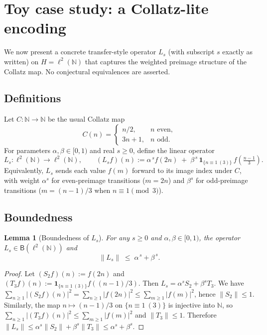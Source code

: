 \documentclass[11pt]{article}
\newtheorem{lemma}[theorem]{Lemma}
\theoremstyle{definition}
\theoremstyle{remark}
\newcommand{\N}{\mathbb{N}}
\newcommand{\1}{\mathbf{1}}
\begin{document}
\section{Toy case study: a Collatz-lite encoding}
We now present a concrete transfer-style operator \(L_s\) (with subscript \(s\) exactly as written) on \(H=\ell^2(\N)\) that captures the weighted preimage structure of the Collatz map. No conjectural equivalences are asserted.

\subsection*{Definitions}
Let \(C:\N\to\N\) be the usual Collatz map
\[
  C(n)=\begin{cases}
    n/2, & n\text{ even},\\
    3n+1, & n\text{ odd}.
  \end{cases}
\]
For parameters \(\alpha,\beta\in[0,1)\) and real \(s\ge 0\), define the linear operator
\[
  L_s: \ell^2(\N)\longrightarrow \ell^2(\N),\qquad (L_s f)(n) := \alpha^{\,s} f(2n)\;+\;\beta^{\,s}\, \mathbf{1}_{\{n\equiv 1\ (3)\}}\, f\!\left(\tfrac{n-1}{3}\right).
\]
Equivalently, \(L_s\) sends each value \(f(m)\) forward to its image index under \(C\), with weight \(\alpha^{s}\) for even-preimage transitions (\(m=2n\)) and \(\beta^{s}\) for odd-preimage transitions (\(m=(n-1)/3\) when \(n\equiv1\pmod 3\)).

\subsection*{Boundedness}
\begin{lemma}[Boundedness of \(L_s\)]\label{lem:Ls-bounded}
For any \(s\ge 0\) and \(\alpha,\beta\in[0,1)\), the operator \(L_s\in \mathsf{B}(\ell^2(\N))\) and
\[
  \|L_s\|\;\le\; \alpha^{\,s} + \beta^{\,s}.
\]
\end{lemma}
\begin{proof}
Let \((S_2 f)(n):=f(2n)\) and \((T_3 f)(n):=\mathbf{1}_{\{n\equiv1\ (3)\}} f((n-1)/3)\). Then \(L_s=\alpha^{s} S_2 + \beta^{s} T_3\). We have
\(\sum_{n\ge1}|(S_2 f)(n)|^2=\sum_{n\ge1}|f(2n)|^2\le\sum_{m\ge1}|f(m)|^2\), hence \(\|S_2\|\le1\).
Similarly, the map \(n\mapsto (n-1)/3\) on \(\{n\equiv1\ (3)\}\) is injective into \(\N\), so
\(\sum_{n\ge1}|(T_3 f)(n)|^2\le\sum_{m\ge1}|f(m)|^2\) and \(\|T_3\|\le1\).
Therefore \(\|L_s\|\le \alpha^{s}\|S_2\|+\beta^{s}\|T_3\|\le \alpha^{s}+\beta^{s}\).
\end{proof}
\end{document}
